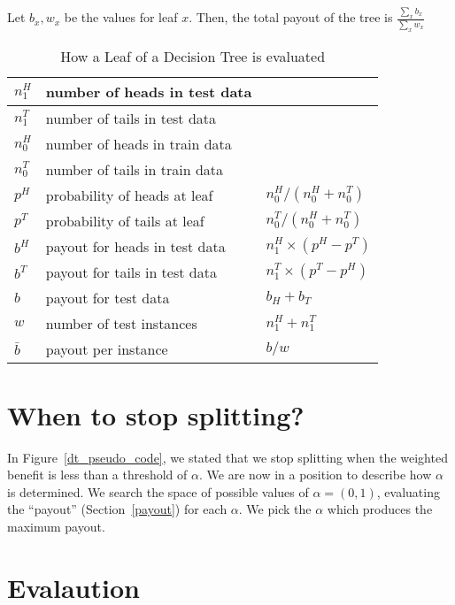 Let \(b_x, w_x\) be the values for leaf \(x\). Then, the total payout of the tree is \(\frac{\sum_x b_x}{\sum_x w_x}\)

\begin{table}[hbtp]
\centering
\begin{tabular}{|l|l|l|} \hline \hline
\(n^H_1\) & number of heads in test data & \\ \hline
\(n^T_1\) & number of tails in test data & \\ \hline
\(n^H_0\) & number of heads in train data&  \\ \hline
\(n^T_0\) & number of tails in train data&  \\ \hline
\(p^H\) & probability of heads at leaf & \(n^H_0 / (n^H_0 + n^T_0)\) \\ \hline
\(p^T\) & probability of tails at leaf & \(n^T_0 / (n^H_0 + n^T_0)\) \\ \hline
\(b^H\) & payout for heads in test data & \(n^H_1 \times ( p^H - p^T )\)  \\ \hline
\(b^T\) & payout for tails in test data & \(n^T_1 \times ( p^T - p^H )\)  \\ \hline
\(b\) & payout for test data & \(b_H + b_T\) \\ \hline

\(w\) & number of test instances & \(n^H_1 + n^T_1\) \\ \hline
\(\bar{b}\) & payout per instance & \(b/w\) \\ \hline
\hline
\end{tabular}
\label{dt_eval_code}
\caption{How a Leaf of a Decision Tree is evaluated}
\end{table}

\section{When to stop splitting?}

In Figure~\ref{dt_pseudo_code}, we stated that we stop splitting when the weighted benefit
is less than a threshold of \(\alpha\). We are now in a position to describe how
\(\alpha\) is determined. We search the space of possible values of \(\alpha =
(0, 1)\), evaluating the ``payout'' (Section~\ref{payout}) for each \(\alpha\). 
We pick the \(\alpha\) which produces the maximum payout. 
%
\section{Evalaution}

